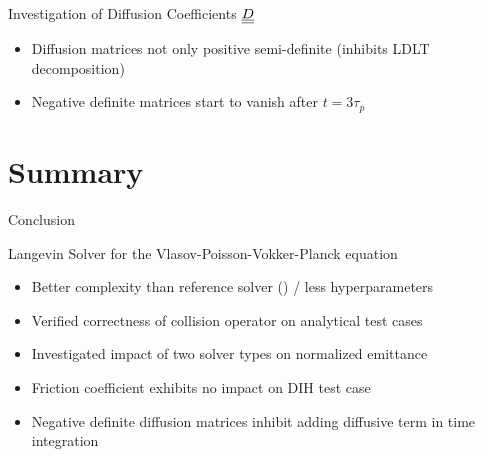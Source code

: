 \begin{frame}{Investigation of Diffusion Coefficients $\underline{\underline{D}}$}
    \begin{itemize}
        \itemVspace
        \item<1-> Diffusion matrices not only positive semi-definite (inhibits LDLT decomposition)
        \item<3-> Negative definite matrices start to vanish after $t = 3\tau_p$
    \end{itemize}
    
\end{frame}

\section{Summary}

\begin{frame}[c]{Conclusion}

    \begin{block}{Langevin Solver for the Vlasov-Poisson-Vokker-Planck equation}
    \begin{itemize}
        \itemVspace
        \setlength\itemsep{1.5em}
        \item<1-> Better complexity than reference solver (\pcubem) / less hyperparameters
        \item<2-> Verified correctness of collision operator on analytical test cases
        \item<3-> Investigated impact of two solver types on normalized emittance
        \item<4-> Friction coefficient exhibits no impact on DIH test case
        \item<5-> Negative definite diffusion matrices inhibit adding diffusive term in time integration
    \end{itemize}
    \end{block}
\end{frame}

